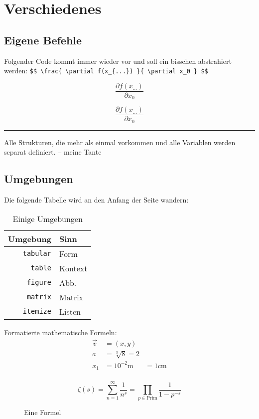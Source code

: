\documentclass{article}
\begin{document}
\section{Verschiedenes}
\subsection{Eigene Befehle}
Folgender Code kommt immer wieder vor und soll ein bisschen abstrahiert werden:
\lstinline+$$ \frac{ \partial f(x_{...}) }{ \partial x_0 } $$+

$$ \frac{ \partial f(x_{...}) }{ \partial x_0 } $$

\newcommand{\partialdiff}[2]{ %
	\frac{\partial #1}{\partial #2} %
}
$$ \partialdiff{ f(x_{...}) }{ x_0 } $$

\hrule\vspace{1em}
\glqq Alle Strukturen, die mehr als einmal vorkommen und alle Variablen werden separat definiert.\grqq{} -- meine Tante

\subsection{Umgebungen}
Die folgende Tabelle wird an den Anfang der Seite wandern:
\begin{table}
\begin{tabular}{r|l}
	Umgebung & Sinn \\
	\hline
	{\tt tabular} & Form \\
	{\tt table} & Kontext \\
	{\tt figure} & Abb. \\
	{\tt matrix} & Matrix \\
	{\tt itemize} & Listen \\
\end{tabular}
	\label{tab:environments}
	\caption{Einige Umgebungen}
\end{table}

Formatierte mathematische Formeln:
\begin{align*}
	\vec{v} &= (x, y) \\
	a   &= \sqrt[3]{8} = 2 \\
	x_1 &= 10^{-2}\text{m} &= 1\text{cm} \\
\end{align*}

\begin{figure}
$$ \zeta(s)
	= \sum_{n=1}^\infty \frac{1}{n^s}
	= \prod_{p \in \text{Prim}} \frac{1}{1-p^{-s}}
$$
\caption{Eine Formel}
\label{fig:zeta}
\end{figure}
\end{document}
